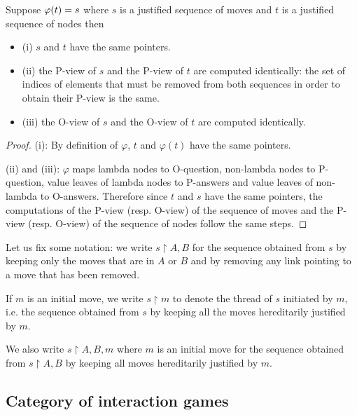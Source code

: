 \begin{property}
\label{proper:phi_pview} Suppose $\varphi(t) = s$ where $s$ is a
justified sequence of moves and $t$ is a justified sequence of nodes
then
\begin{itemize}
\item (i) $s$ and $t$ have the same pointers.
\item (ii) the P-view of $s$ and the P-view of $t$ are computed
identically: the set of indices of elements that must be removed
from both sequences in order to obtain their P-view is the same.
\item (iii) the O-view of $s$ and the O-view of $t$ are computed identically.
\end{itemize}
\end{property}
\begin{proof}
(i): By definition of $\varphi$, $t$ and $\varphi(t)$ have the same
pointers.

(ii) and (iii): $\varphi$ maps lambda nodes to O-question,
non-lambda nodes to P-question, value leaves of lambda nodes to P-answers and
value leaves of non-lambda to O-answers. Therefore since $t$ and $s$ have the
same pointers, the computations of the P-view (resp. O-view) of the
sequence of moves and the P-view (resp. O-view) of the sequence of
nodes follow the same steps.
\end{proof}


Let us fix some notation: we write $s\upharpoonright A,B$ for the
sequence obtained from $s$ by keeping only the moves that are in $A$ or $B$ and by removing any link pointing to a move that
has been removed.

If $m$ is an initial move, we write $s \upharpoonright m$ to
denote the thread of $s$ initiated by $m$, i.e. the sequence obtained from $s$ by keeping all the moves
hereditarily justified by $m$.

We also write $s \upharpoonright A,B,m$ where $m$ is an initial move
for the sequence obtained from $s \upharpoonright A,B$ by keeping
all moves hereditarily justified by $m$.



\subsection{Category of interaction games}

